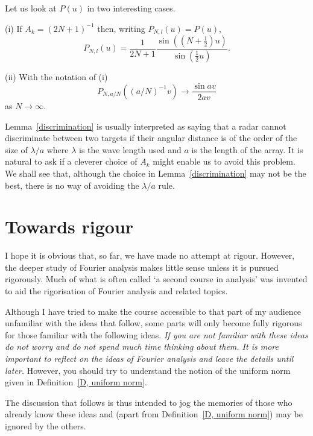 Let us look at $P(u)$ in two interesting cases.
\begin{lemma}\label{discrimination}
(i) If $A_{k}=(2N+1)^{-1}$ then,
writing $P_{N,l}(u)=P(u)$,
\[P_{N,l}(u)=
\frac{1}{2N+1}\frac{\sin((N+\tfrac{1}{2})u)}{\sin(\tfrac{1}{2}u)}.\]

(ii) With the notation of (i)
\[P_{N,a/N}((a/N)^{-1}v)\rightarrow\frac{\sin av}{2av}\]
as $N\rightarrow\infty$.
\end{lemma}
Lemma~\ref{discrimination} is usually interpreted
as saying that a radar cannot discriminate between
two targets if their angular distance is of the
order of the size of $\lambda/a$ where $\lambda$
is the wave length used and $a$ is the length of the array.
It is natural to ask if a cleverer choice of $A_{k}$
might enable us to avoid this problem. We shall see
that, although the choice in Lemma~\ref{discrimination} may
not be the best, there is no way of avoiding
the $\lambda/a$ rule.
\section{Towards rigour} I hope it is obvious that, so far,
we have made no attempt at rigour. However, the deeper
study of Fourier analysis makes little sense unless it
is pursued rigorously. Much of what is often called
`a second course in analysis' was invented to aid the
rigorisation of  Fourier analysis and related topics.

Although I have tried to make the course accessible
to that part of my audience unfamiliar with the
ideas that follow, some parts will only become
fully rigorous for those familiar with the following ideas.
\emph{If you are not familiar with these ideas do
not worry and do not spend much time thinking about them.
It is more important to reflect on the ideas of Fourier
analysis and leave the details until later.} However,
you should try to understand the notion of the
uniform norm given in Definition~\ref{D, uniform norm}.

The discussion that follows is thus intended to jog
the memories of those who already know these ideas
and (apart from  Definition~\ref{D, uniform norm})
may be ignored by the others.

